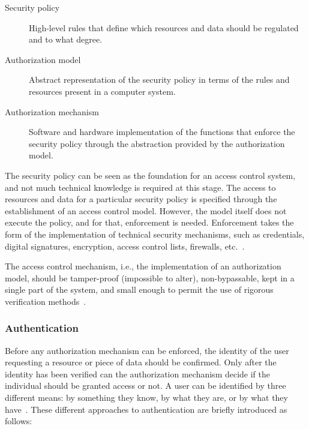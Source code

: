 \documentclass[12pt]{article}
\begin{document}
\begin{description}
\item[Security policy] High-level rules that define which resources and data should be regulated and to what degree. 
\item[Authorization model] Abstract representation of the security policy in terms of the rules and resources present in a computer system.
\item[Authorization mechanism] Software and hardware implementation of the functions that enforce the security policy through the abstraction provided by the authorization model. 
\end{description}

The security policy can be seen as the foundation for an access control system, and not much technical knowledge is required at this stage. The access to resources and data for a particular security policy is specified through the establishment of an access control model. However, the model itself does not execute the policy, and for that, enforcement is needed. Enforcement takes the form of the implementation of technical security mechanisms, such as credentials, digital signatures, encryption, access control lists, firewalls, etc.~\cite{access_01}.

The access control mechanism, i.e., the implementation of an authorization model, should be tamper-proof (impossible to alter), non-bypassable, kept in a single part of the system, and small enough to permit the use of rigorous verification methods~\cite{access_02}.

\subsubsection{Authentication}

Before any authorization mechanism can be enforced, the identity of the user requesting a resource or piece of data should be confirmed. Only after the identity has been verified can the authorization mechanism decide if the individual should be granted access or not. A user can be identified by three different means: by something they know, by what they are, or by what they have~\cite{stallings_01}. These different approaches to authentication are briefly introduced as follows:
\end{document}
